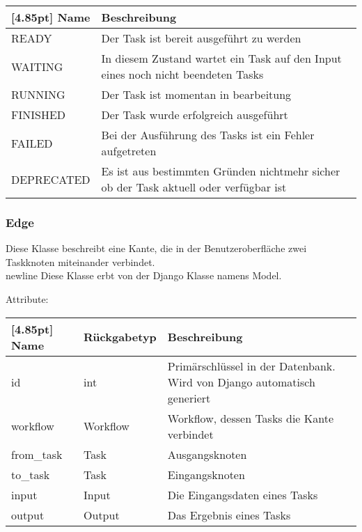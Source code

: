 			\begin{center}
            	\renewcommand{\arraystretch}{1.5}
	            \setlength\tabcolsep{5pt}
            	\begin{tabularx}{\textwidth}{|l|X|}
            		\hline
                    \rowcolor[gray]{0.75}[4.85pt]
            	    Name & Beschreibung \\ \hline
            	    READY & Der Task ist bereit ausgeführt zu werden \\ \hline
            		WAITING & In diesem Zustand wartet ein Task auf den Input eines noch nicht beendeten Tasks \\ \hline
            		RUNNING & Der Task ist momentan in bearbeitung \\ \hline
            		FINISHED & Der Task wurde erfolgreich ausgeführt \\ \hline
            		FAILED & Bei der Ausführung des Tasks ist ein Fehler aufgetreten \\ \hline
            		DEPRECATED & Es ist aus bestimmten Gründen nichtmehr sicher ob der Task aktuell oder verfügbar ist\\ \hline
				\end{tabularx}
			\end{center}
        \subsubsection{Edge}	
    			Diese Klasse beschreibt eine Kante, die in der Benutzeroberfläche zwei Taskknoten miteinander verbindet. \\newline
    			Diese Klasse erbt von der Django Klasse namens \glqq Model\grqq .
    			
    			Attribute:
    			\begin{center}
    				\setlength\tabcolsep{5pt}
    				\renewcommand{\arraystretch}{1.5}
    				
    				\begin{tabularx}{\textwidth}{|l|l|X|}
    					\hline
    					\rowcolor[gray]{0.75}[4.85pt]
    					Name & Rückgabetyp & Beschreibung \\ \hline 
    	           		id & int & Primärschlüssel in der Datenbank. Wird von Django automatisch generiert \\ \hline
    	           		workflow & Workflow & Workflow, dessen Tasks die Kante verbindet \\ \hline
    	           		from\_task & Task & Ausgangsknoten \\ \hline
    	           	    to\_task & Task & Eingangsknoten \\ \hline
    	           		input & Input & Die Eingangsdaten eines Tasks\\ \hline
    	           		output & Output & Das Ergebnis eines Tasks \\
    	           		
    	           		\hline
    				\end{tabularx}
    			\end{center}
